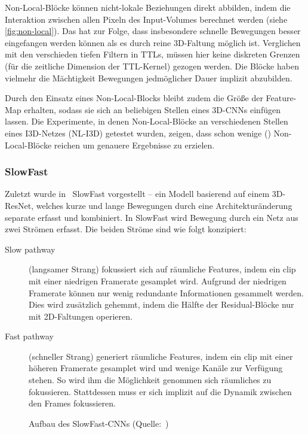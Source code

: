 Non-Local-Blöcke können nicht-lokale Beziehungen direkt abbilden, indem die Interaktion zwischen allen Pixeln des Input-Volumes berechnet werden (siehe \autoref{fig:non-local}).
Das hat zur Folge, dass insbesondere schnelle Bewegungen besser eingefangen werden können als es durch reine 3D-Faltung möglich ist.
Verglichen mit den verschieden tiefen Filtern in TTLs, müssen hier keine diskreten Grenzen (für die zeitliche Dimension der TTL-Kernel) gezogen werden.
Die Blöcke haben vielmehr die Mächtigkeit Bewegungen jedmöglicher Dauer implizit abzubilden.

Durch den Einsatz eines Non-Local-Blocks bleibt zudem die Größe der Feature-Map erhalten, sodass sie sich an beliebigen Stellen eines 3D-CNNs einfügen lassen.
Die Experimente, in denen Non-Local-Blöcke an verschiedenen Stellen eines I3D-Netzes (NL-I3D) getestet wurden, zeigen, dass schon wenige () Non-Local-Blöcke reichen um genauere Ergebnisse zu erzielen.

\subsubsection*{SlowFast}

Zuletzt wurde in~\cite{Feichtenhofer18} SlowFast vorgestellt -- ein Modell basierend auf einem 3D-ResNet, welches kurze und lange Bewegungen durch eine Architekturänderung separate erfasst und kombiniert.
In SlowFast wird Bewegung durch ein Netz aus zwei Strömen erfasst.
Die beiden Ströme sind wie folgt konzipiert:

\begin{description}
    \item[Slow pathway]
    (langsamer Strang) fokussiert sich auf räumliche Features, indem ein \gls{clip} mit einer niedrigen Framerate gesamplet wird.
    Aufgrund der niedrigen Framerate können nur wenig redundante Informationen gesammelt werden.
    Dies wird zusätzlich gehemmt, indem die Hälfte der Residual-Blöcke nur mit 2D-Faltungen operieren.
    \item[Fast pathway]
    (schneller Strang) generiert räumliche Features, indem ein \gls{clip} mit einer höheren Framerate gesamplet wird und wenige Kanäle zur Verfügung stehen.
    So wird ihm die Möglichkeit genommen sich räumliches zu fokussieren.
    Stattdessen muss er sich implizit auf die Dynamik zwischen den Frames fokussieren.
\end{description}

\begin{figure}[h!]
    \centering
    \caption[Aufbau des SlowFast-CNNs]{Aufbau des SlowFast-CNNs (Quelle:~\cite{Feichtenhofer18})}
    \label{fig:slowfast}
\end{figure}

